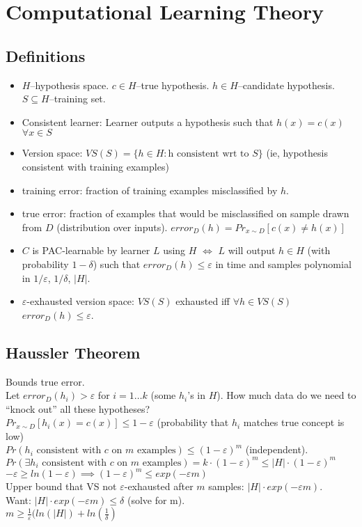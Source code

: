 \documentclass[titlepage,11pt]{article}
\begin{document}
\section{Computational Learning Theory}
\subsection{Definitions}
\begin{itemize}
\item $H$--hypothesis space. $c \in H$--true hypothesis. $h \in H$--candidate hypothesis. $S \subseteq H$--training set.
\item Consistent learner: Learner outputs a hypothesis such that $h(x) = c(x)$ $\forall x \in S$
\item Version space: $VS(S) = \{ h \in H: $h$ \text{ consistent wrt to } S \}$ (ie, hypothesis consistent with training examples)
\item training error: fraction of training examples misclassified by $h$.
\item true error: fraction of examples that would be misclassified on sample drawn from $D$ (distribution over inputs). $error_D(h) = Pr_{x \sim D} [c(x) \neq h(x)]$
\item $C$ is PAC-learnable by learner $L$ using $H$ $\iff$ $L$ will output $h \in H$ (with probability $1-\delta$) such that $error_D(h) \leq \varepsilon$ in time and samples polynomial in $1/\varepsilon$, $1/ \delta$, $|H|$.
\item $\varepsilon$-exhausted version space: $VS(S)$ exhausted iff $\forall h \in VS(S)$ $error_D(h) \leq \varepsilon$.
\end{itemize}

\subsection{Haussler Theorem}
Bounds true error.\\
Let $error_D(h_i) > \varepsilon$ for $i = 1 \dots k$ (some $h_i$'s in $H$). How much data do we need to ``knock out'' all these hypotheses?\\
$Pr_{x \sim D} [h_i(x) = c(x)] \leq 1- \varepsilon$ (probability that $h_i$ matches true concept is low)\\
$Pr(h_i \text{ consistent with $c$ on $m$ examples}) \leq (1- \varepsilon)^m$ (independent).\\
$Pr(\exists h_i \text{ consistent with $c$ on $m$ examples}) = k \cdot (1- \varepsilon)^m \leq |H| \cdot (1-\varepsilon)^m$\\
$-\varepsilon \geq ln(1- \varepsilon) \implies (1- \varepsilon)^m \leq exp(-\varepsilon m)$\\
Upper bound that VS not $\varepsilon$-exhausted after $m$ samples: $|H|\cdot exp(-\varepsilon m)$.\\
Want: $|H| \cdot exp(-\varepsilon m) \leq \delta$ (solve for m).\\
$m \geq \frac{1}{\varepsilon} (ln(|H|) + ln (\frac{1}{\delta})$
\end{document}
